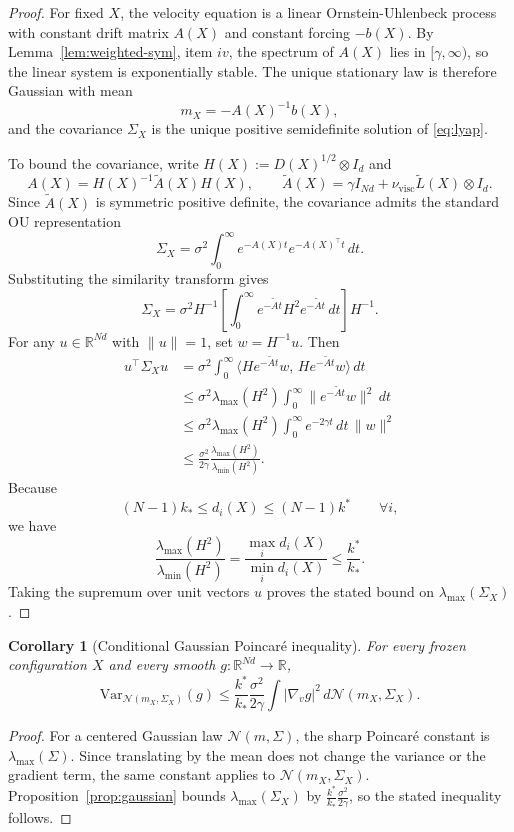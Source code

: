 \documentclass[11pt]{article}
\newtheorem{corollary}[theorem]{Corollary}
\theoremstyle{definition}
\theoremstyle{remark}
\newcommand{\R}{\mathbb{R}}
\begin{document}
\begin{proof}
For fixed \(X\), the velocity equation is a linear Ornstein-Uhlenbeck process
with constant drift matrix \(A(X)\) and constant forcing \(-b(X)\). By
Lemma~\ref{lem:weighted-sym}, item $iv$, the spectrum of \(A(X)\) lies in
\([\gamma,\infty)\), so the linear system is exponentially stable. The unique
stationary law is therefore Gaussian with mean
\[
m_X=-A(X)^{-1}b(X),
\]
and the covariance \(\Sigma_X\) is the unique positive semidefinite solution of
\eqref{eq:lyap}.

To bound the covariance, write \(H(X):=D(X)^{1/2}\otimes I_d\) and
\[
A(X)=H(X)^{-1}\widetilde A(X)H(X),
\qquad
\widetilde A(X)=\gamma I_{Nd}+\nu_{\mathrm{visc}}\widetilde L(X)\otimes I_d.
\]
Since \(\widetilde A(X)\) is symmetric positive definite, the covariance admits
the standard OU representation
\[
\Sigma_X
=
\sigma^2\int_0^\infty e^{-A(X)t}e^{-A(X)^\top t}\,dt.
\]
Substituting the similarity transform gives
\[
\Sigma_X
=
\sigma^2 H^{-1}\left[\int_0^\infty
e^{-\widetilde A t}H^2e^{-\widetilde A t}\,dt\right]H^{-1}.
\]
For any \(u\in\R^{Nd}\) with \(\|u\|=1\), set \(w=H^{-1}u\). Then
\begin{align*}
u^\top \Sigma_X u
&=
\sigma^2\int_0^\infty
\langle H e^{-\widetilde A t}w,\,H e^{-\widetilde A t}w\rangle\,dt\\
&\leq
\sigma^2 \lambda_{\max}(H^2)
\int_0^\infty \|e^{-\widetilde A t}w\|^2\,dt\\
&\leq
\sigma^2 \lambda_{\max}(H^2)\int_0^\infty e^{-2\gamma t}\,dt\,\|w\|^2\\
&\leq
\frac{\sigma^2}{2\gamma}
\frac{\lambda_{\max}(H^2)}{\lambda_{\min}(H^2)}.
\end{align*}
Because
\[
(N-1)k_*\leq d_i(X)\leq (N-1)k^*
\qquad
\forall i,
\]
we have
\[
\frac{\lambda_{\max}(H^2)}{\lambda_{\min}(H^2)}
=
\frac{\max_i d_i(X)}{\min_i d_i(X)}
\leq
\frac{k^*}{k_*}.
\]
Taking the supremum over unit vectors \(u\) proves the stated bound on
\(\lambda_{\max}(\Sigma_X)\).
\end{proof}

\begin{corollary}[Conditional Gaussian Poincar\'e inequality]\label{cor:conditional-poincare}
For every frozen configuration $X$ and every smooth
$g:\R^{Nd}\to \R$,
\[
\mathrm{Var}_{\mathcal N(m_X,\Sigma_X)}(g)
\leq
\frac{k^*}{k_*}\frac{\sigma^2}{2\gamma}
\int |\nabla_v g|^2\,d\mathcal N(m_X,\Sigma_X).
\]
\end{corollary}

\begin{proof}
For a centered Gaussian law \(\mathcal N(m,\Sigma)\), the sharp Poincar\'e
constant is \(\lambda_{\max}(\Sigma)\). Since translating by the mean does not
change the variance or the gradient term, the same constant applies to
\(\mathcal N(m_X,\Sigma_X)\). Proposition~\ref{prop:gaussian} bounds
\(\lambda_{\max}(\Sigma_X)\) by \(\frac{k^*}{k_*}\frac{\sigma^2}{2\gamma}\), so
the stated inequality follows.
\end{proof}
\end{document}
